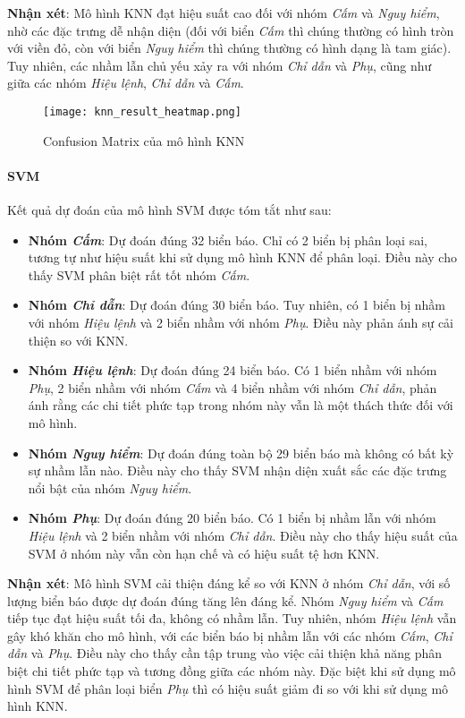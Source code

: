\documentclass[a4paper,12pt]{article}
\begin{document}
\textbf{Nhận xét}:  
Mô hình KNN đạt hiệu suất cao đối với nhóm \textit{Cấm} và \textit{Nguy hiểm}, nhờ các đặc trưng dễ nhận diện (đối với biển \textit{Cấm} thì chúng thường có hình tròn với viền đỏ, còn với biển \textit{Nguy hiểm} thì chúng thường có hình dạng là tam giác). Tuy nhiên, các nhầm lẫn chủ yếu xảy ra với nhóm \textit{Chỉ dẫn} và \textit{Phụ}, cũng như giữa các nhóm \textit{Hiệu lệnh}, \textit{Chỉ dẫn} và \textit{Cấm}.

\begin{figure}[H]
    \centering
    \texttt{[image: knn\_result\_heatmap.png]}
    \caption{Confusion Matrix của mô hình KNN}
    \label{fig:knn_confusion_matrix}
\end{figure}

\paragraph{SVM}  
Kết quả dự đoán của mô hình SVM được tóm tắt như sau:
\begin{itemize}
    \item \textbf{Nhóm \textit{Cấm}}: Dự đoán đúng 32 biển báo. Chỉ có 2 biển bị phân loại sai, tương tự như hiệu suất khi sử dụng mô hình KNN để phân loại. Điều này cho thấy SVM phân biệt rất tốt nhóm \textit{Cấm}.
    \item \textbf{Nhóm \textit{Chỉ dẫn}}: Dự đoán đúng 30 biển báo. Tuy nhiên, có 1 biển bị nhầm với nhóm \textit{Hiệu lệnh} và 2 biển nhầm với nhóm \textit{Phụ}. Điều này phản ánh sự cải thiện so với KNN.
    \item \textbf{Nhóm \textit{Hiệu lệnh}}: Dự đoán đúng 24 biển báo. Có 1 biển nhầm với nhóm \textit{Phụ}, 2 biển nhầm với nhóm \textit{Cấm} và 4 biển nhầm với nhóm \textit{Chỉ dẫn}, phản ánh rằng các chi tiết phức tạp trong nhóm này vẫn là một thách thức đối với mô hình.
    \item \textbf{Nhóm \textit{Nguy hiểm}}: Dự đoán đúng toàn bộ 29 biển báo mà không có bất kỳ sự nhầm lẫn nào. Điều này cho thấy SVM nhận diện xuất sắc các đặc trưng nổi bật của nhóm \textit{Nguy hiểm}.
    \item \textbf{Nhóm \textit{Phụ}}: Dự đoán đúng 20 biển báo. Có 1 biển bị nhầm lẫn với nhóm \textit{Hiệu lệnh} và 2 biển nhầm với nhóm \textit{Chỉ dẫn}. Điều này cho thấy hiệu suất của SVM ở nhóm này vẫn còn hạn chế và có hiệu suất tệ hơn KNN.
\end{itemize}

\textbf{Nhận xét}:  
Mô hình SVM cải thiện đáng kể so với KNN ở nhóm \textit{Chỉ dẫn}, với số lượng biển báo được dự đoán đúng tăng lên đáng kể. Nhóm \textit{Nguy hiểm} và \textit{Cấm} tiếp tục đạt hiệu suất tối đa, không có nhầm lẫn. Tuy nhiên, nhóm \textit{Hiệu lệnh} vẫn gây khó khăn cho mô hình, với các biển báo bị nhầm lẫn với các nhóm \textit{Cấm}, \textit{Chỉ dẫn} và \textit{Phụ}. Điều này cho thấy cần tập trung vào việc cải thiện khả năng phân biệt chi tiết phức tạp và tương đồng giữa các nhóm này. Đặc biệt khi sử dụng mô hình SVM để phân loại biển \textit{Phụ} thì có hiệu suất giảm đi so với khi sử dụng mô hình KNN.
\end{document}
